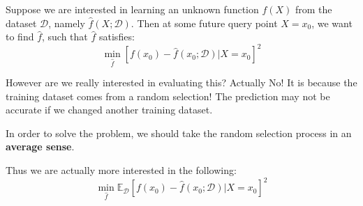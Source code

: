 \documentclass{article}
\theoremstyle{MyNonumberplain}
\theoremstyle{break}
\newcommand{\ev}{\mathbb{E}}
\newcommand{\evd}{\ev_{\mathcal{D}}}
\theoremstyle{break}
\begin{document}
Suppose we are interested in learning an unknown function $f(X)$ from the dataset $\mathcal{D}$,
namely $\hat{f}(X;\mathcal{D})$. Then at some future query point $X=x_0$, we want to
find $\hat{f}$, such that $\hat{f}$ satisfies: $$\min_{\hat{f}}[f(x_0)-\hat{f}(x_0;\mathcal{D})|X=x_0]^2$$

However are we really interested in evaluating this? Actually No! It is because the 
training dataset comes from a random selection! The prediction may not be accurate
if we changed another training dataset.

In order to solve the problem, we should take the random selection process in an \textbf{average sense}. 

Thus we are actually more interested in the following: $$\min_{\hat{f}}\evd[f(x_0)-\hat{f}(x_0;\mathcal{D})|X=x_0]^2$$
\end{document}
